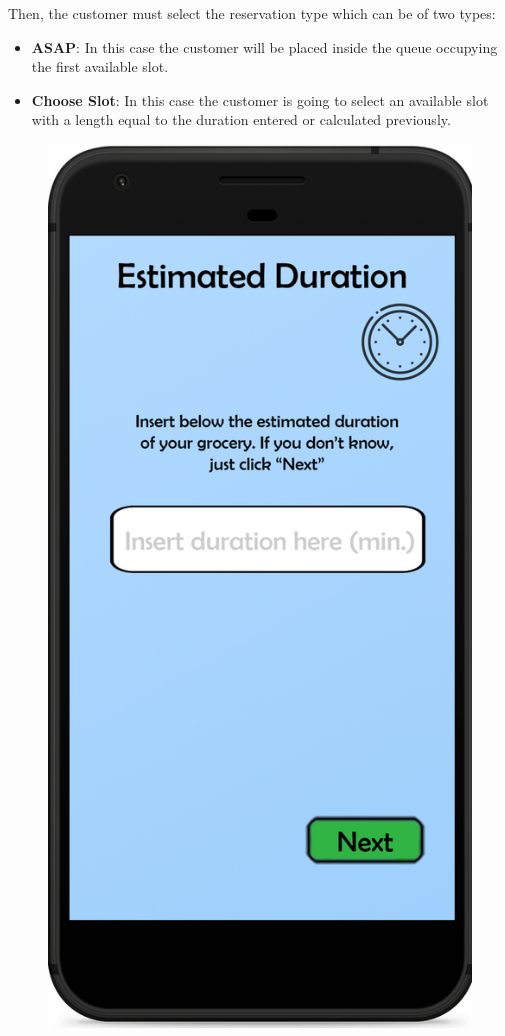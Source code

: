 \documentclass{article}
\begin{document}
		Then, the customer must select the reservation type which can be of two types:
		\begin{itemize}
			\item {\bfseries ASAP}: In this case the customer will be placed inside the queue occupying the first available slot.
			\item {\bfseries Choose Slot}: In this case the customer is going to select an available slot with a length equal to the duration entered or calculated previously.
		\end{itemize}
		\bigskip
		\bigskip
		\begin{figure}[!h]
			\centering
			\begin{minipage}[!h]{0.4\textwidth}
				\includegraphics[width=\textwidth]{../Mockups/EstimatedDuration.png}

\end{minipage}
\end{figure}
\end{document}
